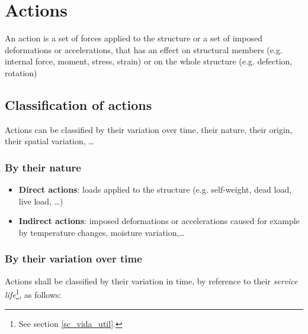 \section{Actions} \label{sc_acciones}
An action is a set of forces applied to the structure  or a set of imposed deformations or accelerations, that has an effect on structural members (e.g. internal force, moment, stress, strain) or on the whole structure (e.g. defection, rotation)

\subsection{Classification of actions}
Actions can be classified by their variation over time, their nature, their origin, their spatial variation, \ldots

\subsubsection{By their nature}
\begin{itemize}
\item \textbf{Direct actions}: loads applied to the structure (e.g. self-weight, dead load, live load, \ldots)
\item \textbf{Indirect actions}: imposed deformations or accelerations caused for example by temperature changes, moisture variation,\ldots
\end{itemize}

\subsubsection{By their variation over time} \label{sc_var_tiempo}
Actions shall be classified by their variation in time, by reference to their \emph{service life}\footnote{See section \ref{sc_vida_util}.}, as follows:

